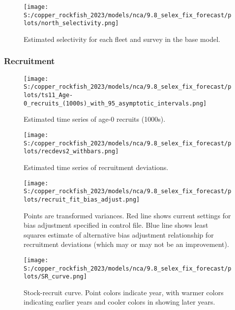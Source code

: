 \documentclass[
  letterpaper,
]{article}
\begin{document}
\begin{figure}
\centering
\texttt{[image: S:/copper\_rockfish\_2023/models/nca/9.8\_selex\_fix\_forecast/plots/north\_selectivity.png]}
\caption{Estimated selectivity for each fleet and survey in the base model.\label{fig:est-selex}}
\end{figure}

\pagebreak

\hypertarget{recruitment}{%
\subsubsection{Recruitment}\label{recruitment}}

\begin{figure}
\centering
\texttt{[image: S:/copper\_rockfish\_2023/models/nca/9.8\_selex\_fix\_forecast/plots/ts11\_Age-0\_recruits\_(1000s)\_with\_95\_asymptotic\_intervals.png]}
\caption{Estimated time series of age-0 recruits (1000s).\label{fig:recruits}}
\end{figure}

\pagebreak

\begin{figure}
\centering
\texttt{[image: S:/copper\_rockfish\_2023/models/nca/9.8\_selex\_fix\_forecast/plots/recdevs2\_withbars.png]}
\caption{Estimated time series of recruitment deviations.\label{fig:rec-devs}}
\end{figure}

\pagebreak

\begin{figure}
\centering
\texttt{[image: S:/copper\_rockfish\_2023/models/nca/9.8\_selex\_fix\_forecast/plots/recruit\_fit\_bias\_adjust.png]}
\caption{Points are transformed variances. Red line shows current settings for bias adjustment specified in control file. Blue line shows least squares estimate of alternative bias adjustment relationship for recruitment deviations (which may or may not be an improvement).\label{fig:bias-adjust}}
\end{figure}

\newpage

\begin{figure}
\centering
\texttt{[image: S:/copper\_rockfish\_2023/models/nca/9.8\_selex\_fix\_forecast/plots/SR\_curve.png]}
\caption{Stock-recruit curve. Point colors indicate year, with warmer colors indicating earlier years and cooler colors in showing later years.\label{fig:bh-curve}}
\end{figure}
\end{document}
